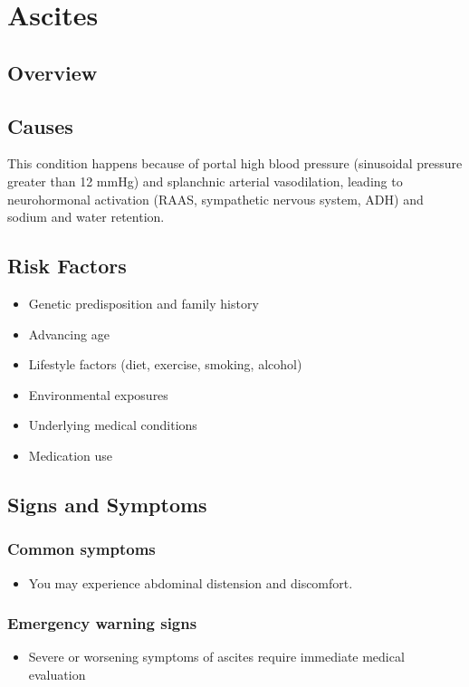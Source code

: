\chapter{Ascites}
\label{sec:Ascites}

\section{Overview}

\section{Causes}
This condition happens because of portal high blood pressure (sinusoidal pressure greater than 12 mmHg) and splanchnic arterial vasodilation, leading to neurohormonal activation (RAAS, sympathetic nervous system, ADH) and sodium and water retention.     
\section{Risk Factors}

\begin{itemize}[noitemsep]
  \item Genetic predisposition and family history
  \item Advancing age
  \item Lifestyle factors (diet, exercise, smoking, alcohol)
  \item Environmental exposures
  \item Underlying medical conditions
  \item Medication use
\end{itemize}
\section{Signs and Symptoms}

\subsection{Common symptoms}
\begin{itemize}[noitemsep]
  \item You may experience abdominal distension and discomfort. 
  \end{itemize}

\subsection{Emergency warning signs}
\begin{itemize}[noitemsep]
  \item Severe or worsening symptoms of ascites require immediate medical evaluation
\end{itemize}
